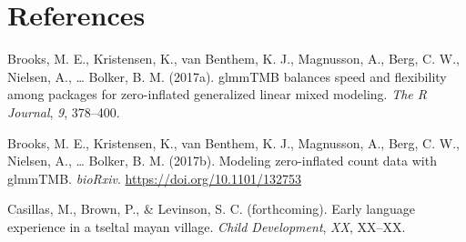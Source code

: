 \documentclass[,man,floatsintext]{apa6}
\begin{document}
\FloatBarrier

\section{References}\label{refs}

\begingroup
\setlength{\parindent}{-0.5in} \setlength{\leftskip}{0.5in}

\hypertarget{refs}{}
\hypertarget{ref-R-glmmTMB}{}
Brooks, M. E., Kristensen, K., van Benthem, K. J., Magnusson, A., Berg,
C. W., Nielsen, A., \ldots{} Bolker, B. M. (2017a). glmmTMB balances
speed and flexibility among packages for zero-inflated generalized
linear mixed modeling. \emph{The R Journal}, \emph{9}, 378--400.

\hypertarget{ref-brooks2017modeling}{}
Brooks, M. E., Kristensen, K., van Benthem, K. J., Magnusson, A., Berg,
C. W., Nielsen, A., \ldots{} Bolker, B. M. (2017b). Modeling
zero-inflated count data with glmmTMB. \emph{bioRxiv}.
\url{https://doi.org/10.1101/132753}

\hypertarget{ref-casillasFCearly}{}
Casillas, M., Brown, P., \& Levinson, S. C. (forthcoming). Early
language experience in a tseltal mayan village. \emph{Child
Development}, \emph{XX}, XX--XX.

\endgroup
\end{document}
